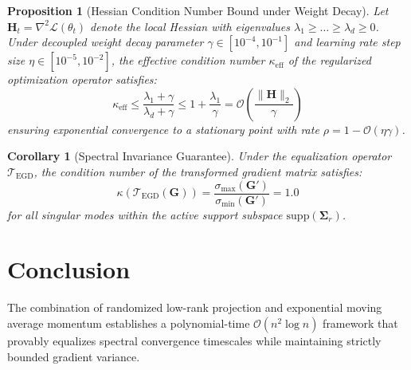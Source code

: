 \documentclass[11pt,a4paper]{article}
\newtheorem{proposition}[theorem]{Proposition}
\newtheorem{corollary}[theorem]{Corollary}
\theoremstyle{remark}
\begin{document}
\begin{proposition}[Hessian Condition Number Bound under Weight Decay]
Let $\mathbf{H}_t = \nabla^2 \mathcal{L}(\theta_t)$ denote the local Hessian with eigenvalues $\lambda_1 \ge \dots \ge \lambda_d \ge 0$. Under decoupled weight decay parameter $\gamma \in [10^{-4}, 10^{-1}]$ and learning rate step size $\eta \in [10^{-5}, 10^{-2}]$, the effective condition number $\kappa_{\text{eff}}$ of the regularized optimization operator satisfies:
\begin{equation}
\kappa_{\text{eff}} \le \frac{\lambda_1 + \gamma}{\lambda_d + \gamma} \le 1 + \frac{\lambda_1}{\gamma} = \mathcal{O}\left(\frac{\|\mathbf{H}\|_2}{\gamma}\right)
\end{equation}
ensuring exponential convergence to a stationary point with rate $\rho = 1 - \mathcal{O}(\eta \gamma)$.
\end{proposition}

\begin{corollary}[Spectral Invariance Guarantee]
Under the equalization operator $\mathcal{T}_{\text{EGD}}$, the condition number of the transformed gradient matrix satisfies:
\begin{equation}
\kappa(\mathcal{T}_{\text{EGD}}(\mathbf{G})) = \frac{\sigma_{\max}(\mathbf{G}')}{\sigma_{\min}(\mathbf{G}')} = 1.0
\end{equation}
for all singular modes within the active support subspace $\mathrm{supp}(\mathbf{\Sigma}_r)$.
\end{corollary}

\section{Conclusion}
The combination of randomized low-rank projection and exponential moving average momentum establishes a polynomial-time $\mathcal{O}(n^2 \log n)$ framework that provably equalizes spectral convergence timescales while maintaining strictly bounded gradient variance.
\end{document}
